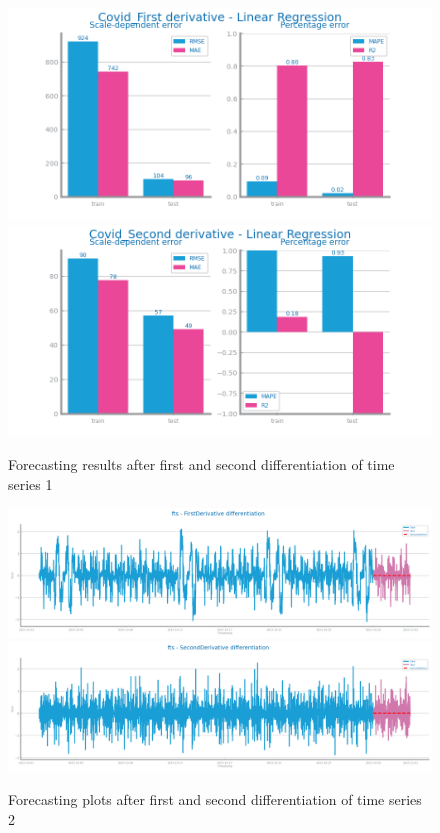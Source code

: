 \documentclass[10pt]{extarticle}
\begin{document}
\begin{figure}[H]
\centering\includegraphics[scale=0.5]{images/dataset1/time_series/Covid_First derivative - Linear Regression_forecasting_eval.png}
\includegraphics[scale=0.5]{images/dataset1/time_series/Covid_Second derivative - Linear Regression_forecasting_eval.png}
\caption{Forecasting results after first and second differentiation of time series 1}
\end{figure}

\begin{figure}[H]
\centering\includegraphics[scale=0.4]{images/dataset2/time_series/fts_forecast_ts_FirstDerivative.png}
\includegraphics[scale=0.4]{images/dataset2/time_series/fts_forecast_ts_SecondDerivative.png}
\caption{Forecasting plots after first and second differentiation of time series 2}
\end{figure}
\end{document}
